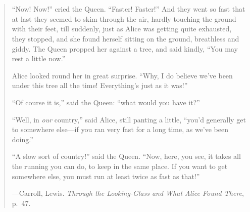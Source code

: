 

\chapter*{}
\chaptermark{}

\vspace*{50 mm}

\small{}

\begin{quote}
	``Now! Now!'' cried the Queen. 
	``Faster! Faster!'' 
	And they went so fast that at last they seemed to skim through the air, 
	hardly touching the ground with their feet, 
	till suddenly, 
	just as Alice was getting quite exhausted, 
	they stopped, 
	and she found herself sitting on the ground, 
	breathless and giddy. 
	The Queen propped her against a tree, and said kindly, 
	``You may rest a little now.''

	Alice looked round her in great surprise. 
	``Why, I do believe we've been under this tree all the time! 
	Everything's just as it was!''

	``Of course it is,'' said the Queen: ``what would you have it?''

	``Well, in \emph{our} country,'' said Alice, still panting a little, 
	``you'd generally get to somewhere else---if you ran very fast for a long time, 
	as we've been doing.''

	``A slow sort of country!'' said the Queen. 
	``Now, here, you see, it takes all the running you can do, to keep in the same place. 
	If you want to get somewhere else, you must run at least twice as fast as that!''

	\hfill---Carroll, Lewis. \emph{Through the Looking-Glass and What Alice Found There}, p.~47.
\end{quote}

\normalsize{}
